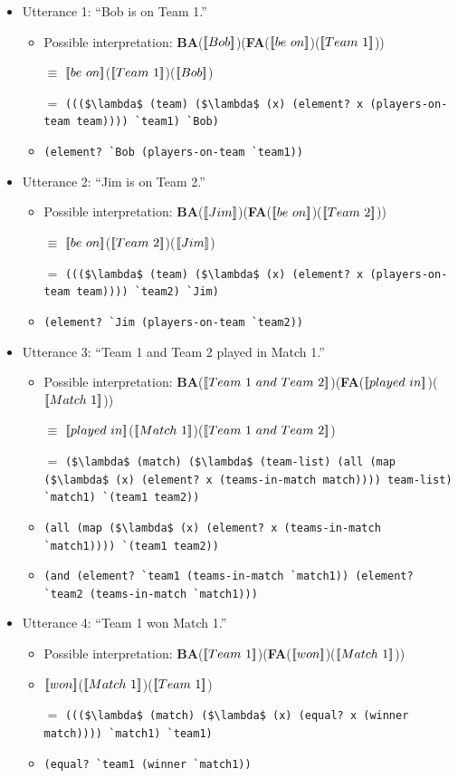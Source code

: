 \documentclass[12pt]{article}
\newcommand{\llbracket}{\ensuremath{\left [\!\left [}}%
\newcommand{\rrbracket}{\ensuremath{\right ]\!\right ]}}
\providecommand{\sv}[1]{\ensuremath{\llbracket #1 \rrbracket}}
\begin{document}
\begin{itemize}
\item Utterance 1: ``Bob is on Team 1.''
\begin{itemize}
\item Possible interpretation: \textbf{BA}(\sv{Bob})(\textbf{FA}(\sv{be\ on})(\sv{Team\ 1}))
\item [$\equiv$] \sv{be\ on}(\sv{Team\ 1})(\sv{Bob})
\item [$=$] \lstinline[mathescape]{((($\lambda$ (team) ($\lambda$ (x) (element? x (players-on-team team)))) `team1) `Bob)}
\item [$\equiv$] \lstinline{(element? `Bob (players-on-team `team1))}
\end{itemize}
\item Utterance 2: ``Jim is on Team 2.''
\begin{itemize}
\item Possible interpretation: \textbf{BA}(\sv{Jim})(\textbf{FA}(\sv{be\ on})(\sv{Team\ 2}))
\item [$\equiv$] \sv{be\ on}(\sv{Team\ 2})(\sv{Jim})
\item [$=$] \lstinline[mathescape]{((($\lambda$ (team) ($\lambda$ (x) (element? x (players-on-team team)))) `team2) `Jim)}
\item [$\equiv$] \lstinline{(element? `Jim (players-on-team `team2))}
\end{itemize}
\item Utterance 3: ``Team 1 and Team 2 played in Match 1.''
\begin{itemize}
\item Possible interpretation: \textbf{BA}(\sv{Team\ 1\ and\ Team\ 2})(\textbf{FA}(\sv{played\ in})(\sv{Match\ 1}))
\item [$\equiv$] \sv{played\ in}(\sv{Match\ 1})(\sv{Team\ 1\ and\ Team\ 2})
\item [$=$] \lstinline[mathescape]{($\lambda$ (match) ($\lambda$ (team-list) (all (map ($\lambda$ (x) (element? x (teams-in-match match)))) team-list) `match1) `(team1 team2))} 
\item [$\equiv$] \lstinline[mathescape]{(all (map ($\lambda$ (x) (element? x (teams-in-match `match1)))) `(team1 team2))}   
\item [$\equiv$] \lstinline[mathescape]{(and (element? `team1 (teams-in-match `match1)) (element? `team2 (teams-in-match `match1)))}  
\end{itemize}
\item Utterance 4: ``Team 1 won Match 1.''
\begin{itemize}
\item Possible interpretation: \textbf{BA}(\sv{Team\ 1})(\textbf{FA}(\sv{won})(\sv{Match\ 1}))
\item [$\equiv$] \sv{won}(\sv{Match\ 1})(\sv{Team\ 1})
\item [$=$] \lstinline[mathescape]{((($\lambda$ (match) ($\lambda$ (x) (equal? x (winner match)))) `match1) `team1)}
\item [$\equiv$] \lstinline{(equal? `team1 (winner `match1))}
\end{itemize}
\end{itemize}
\end{document}
